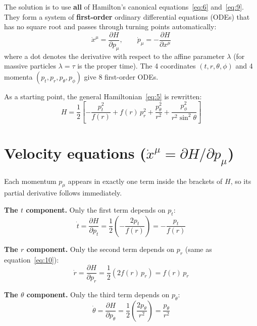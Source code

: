 \documentclass[11pt,a4paper]{article}
\begin{document}
The solution is to use \textbf{all} of Hamilton's canonical equations~\eqref{eq:6} and~\eqref{eq:9}. They form a system of \textbf{first-order} ordinary differential equations (ODEs) that has no square root and passes through turning points automatically:
\begin{equation*}
\boxed{\;\dot{x}^\mu = \frac{\partial H}{\partial p_\mu}, \qquad \dot{p}_\mu = -\frac{\partial H}{\partial x^\mu}\;} \tag{18}\label{eq:18}
\end{equation*}
where a dot denotes the derivative with respect to the affine parameter $\lambda$ (for massive particles $\lambda = \tau$ is the proper time). The 4 coordinates $(t, r, \theta, \phi)$ and 4 momenta $(p_t, p_r, p_\theta, p_\phi)$ give 8 first-order ODEs.

As a starting point, the general Hamiltonian~\eqref{eq:5} is rewritten:
\begin{equation*}
H = \frac{1}{2} \left[ -\frac{p_t^2}{f(r)} + f(r)\, p_r^2 + \frac{p_\theta^2}{r^2} + \frac{p_\phi^2}{r^2 \sin^2\theta} \right]
\end{equation*}

\section{Velocity equations \texorpdfstring{($\dot{x}^\mu = \partial H / \partial p_\mu$)}{}}

Each momentum $p_\mu$ appears in exactly one term inside the brackets of $H$, so its partial derivative follows immediately.

\textbf{The $t$ component.} Only the first term depends on $p_t$:
\begin{equation*}
\dot{t} = \frac{\partial H}{\partial p_t} = \frac{1}{2}\left( -\frac{2 p_t}{f(r)} \right) = -\frac{p_t}{f(r)} \tag{19a}\label{eq:19a}
\end{equation*}

\textbf{The $r$ component.} Only the second term depends on $p_r$ (same as equation~\eqref{eq:10}):
\begin{equation*}
\dot{r} = \frac{\partial H}{\partial p_r} = \frac{1}{2}\left( 2 f(r)\, p_r \right) = f(r)\, p_r \tag{19b}\label{eq:19b}
\end{equation*}

\textbf{The $\theta$ component.} Only the third term depends on $p_\theta$:
\begin{equation*}
\dot{\theta} = \frac{\partial H}{\partial p_\theta} = \frac{1}{2}\left( \frac{2 p_\theta}{r^2} \right) = \frac{p_\theta}{r^2} \tag{19c}\label{eq:19c}
\end{equation*}
\end{document}

